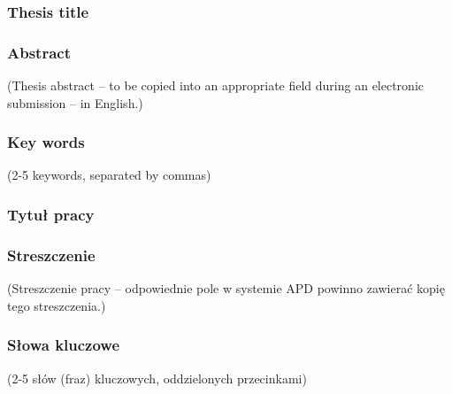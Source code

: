 \subsubsection*{Thesis title}
\Title

\subsubsection*{Abstract}
(Thesis abstract – to be copied into an appropriate field during an electronic submission – in English.)

\subsubsection*{Key words}
(2-5 keywords, separated by commas)

\subsubsection*{Tytuł pracy}
\begin{otherlanguage}{polish}
\TitleAlt
\end{otherlanguage}

\subsubsection*{Streszczenie}
\begin{otherlanguage}{polish}
(Streszczenie pracy – odpowiednie pole w systemie APD powinno zawierać kopię tego streszczenia.)
\end{otherlanguage}

\subsubsection*{Słowa kluczowe}
\begin{otherlanguage}{polish}
(2-5 słów (fraz) kluczowych, oddzielonych przecinkami)
\end{otherlanguage}
